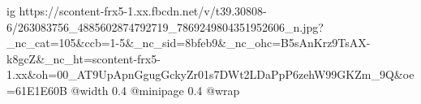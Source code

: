  
 
 
 
 

\ifcmt
  ig https://scontent-frx5-1.xx.fbcdn.net/v/t39.30808-6/263083756_4885602874792719_7869249804351952606_n.jpg?_nc_cat=105&ccb=1-5&_nc_sid=8bfeb9&_nc_ohc=B5sAnKrz9TsAX-k8gcZ&_nc_ht=scontent-frx5-1.xx&oh=00_AT9UpApnGgugGckyZr01s7DWt2LDaPpP6zehW99GKZm_9Q&oe=61E1E60B
  @width 0.4
  @minipage 0.4
  @wrap \parpic[r]
\fi
